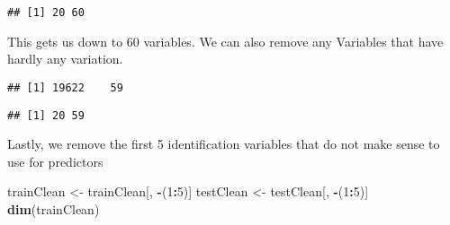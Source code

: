 \documentclass[]{article}
\newenvironment{Shaded}{\begin{snugshade}}{\end{snugshade}}
\newcommand{\DataTypeTok}[1]{\textcolor[rgb]{0.13,0.29,0.53}{#1}}
\newcommand{\DecValTok}[1]{\textcolor[rgb]{0.00,0.00,0.81}{#1}}
\newcommand{\KeywordTok}[1]{\textcolor[rgb]{0.13,0.29,0.53}{\textbf{#1}}}
\newcommand{\NormalTok}[1]{#1}
\newcommand{\OperatorTok}[1]{\textcolor[rgb]{0.81,0.36,0.00}{\textbf{#1}}}
\newcommand{\OtherTok}[1]{\textcolor[rgb]{0.56,0.35,0.01}{#1}}
\newcommand{\StringTok}[1]{\textcolor[rgb]{0.31,0.60,0.02}{#1}}
\begin{document}
\begin{verbatim}
## [1] 20 60
\end{verbatim}

This gets us down to 60 variables. We can also remove any Variables that
have hardly any variation.

\begin{Shaded}
\end{Shaded}

\begin{verbatim}
## [1] 19622    59
\end{verbatim}

\begin{Shaded}
\end{Shaded}

\begin{verbatim}
## [1] 20 59
\end{verbatim}

Lastly, we remove the first 5 identification variables that do not make
sense to use for predictors

\begin{Shaded}
\begin{Highlighting}[]
\NormalTok{trainClean <-}\StringTok{ }\NormalTok{trainClean[, }\OperatorTok{-}\NormalTok{(}\DecValTok{1}\OperatorTok{:}\DecValTok{5}\NormalTok{)]}
\NormalTok{testClean  <-}\StringTok{ }\NormalTok{testClean[, }\OperatorTok{-}\NormalTok{(}\DecValTok{1}\OperatorTok{:}\DecValTok{5}\NormalTok{)]}
\KeywordTok{dim}\NormalTok{(trainClean)}
\end{Highlighting}
\end{Shaded}
\end{document}

